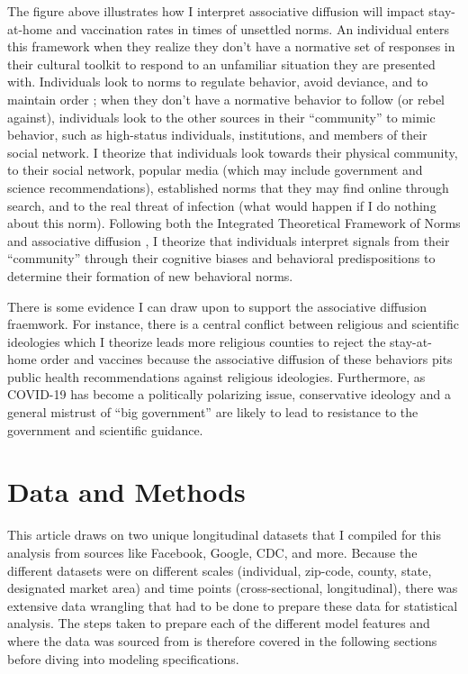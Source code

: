 The figure above illustrates how I interpret associative diffusion will impact
stay-at-home and vaccination rates in times of unsettled norms. An
individual enters this framework when they realize they don't have a normative
set of responses in their cultural toolkit to respond to an unfamiliar situation
they are presented with. Individuals look to norms to regulate behavior, avoid
deviance, and to maintain order \citep{horneNormsIntegratedFramework2020, shepherdStructurePerceptionHow2017}; when they don't have a normative behavior
to follow (or rebel against), individuals look to the other sources in their
``community'' to mimic behavior, such as high-status individuals, institutions,
and members of their social network. I theorize that individuals look towards
their physical community, to their social network, popular media (which may
include government and science recommendations), established norms that they may
find online through search, and to the real threat of infection (what would
happen if I do nothing about this norm). Following both the Integrated
Theoretical Framework of Norms \citep{horneNormsIntegratedFramework2020} and
associative diffusion \citep{dellapostaWhyLiberalsDrink2015, goldbergSocialContagionAssociative2018}, I theorize that individuals interpret
signals from their ``community'' through their cognitive biases and behavioral
predispositions to determine their formation of new behavioral norms.

There is some evidence I can draw upon to support the associative diffusion
fraemwork. For instance, there is a central conflict between religious and
scientific ideologies which I theorize leads more religious counties to reject
the stay-at-home order and vaccines \citep{evansReligionScienceEpistemological2008}
because the associative diffusion of these behaviors pits public health
recommendations against religious ideologies.
Furthermore, as COVID-19 has become a politically polarizing issue, conservative
ideology and a general mistrust of ``big government'' \citep{frank2007, gauchat2008} are likely to lead to resistance to the
government and scientific guidance.

\hypertarget{data-and-methods}{%
\section{Data and Methods}\label{data-and-methods}}

This article draws on two unique longitudinal datasets that I compiled for this
analysis from sources like Facebook, Google, CDC, and more. Because the
different datasets were on different scales (individual, zip-code, county,
state, designated market area) and time points (cross-sectional, longitudinal),
there was extensive data wrangling that had to be done to prepare these data for
statistical analysis. The steps taken to prepare each of the different model
features and where the data was sourced from is therefore covered in the
following sections before diving into modeling specifications.

